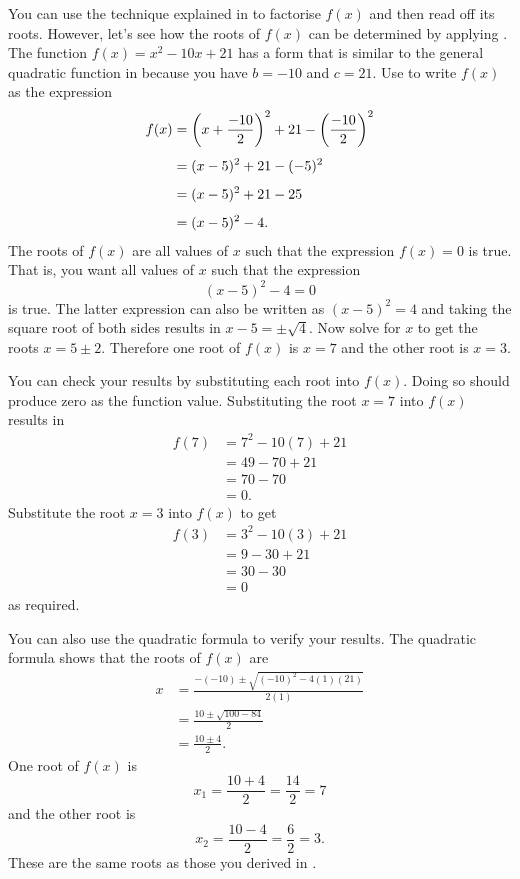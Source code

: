 \documentclass[a4paper,oneside,12pt]{article}
\begin{document}
\begin{solution}
You can use the technique explained
in  to factorise $f(x)$ and then
read off its roots.  However, let's see how the roots of $f(x)$ can be
determined by applying .  The
function $f(x) = x^2 - 10x + 21$ has a form that is similar to the
general quadratic function in 
because you have $b = -10$ and $c = 21$.  Use
 to write $f(x)$ as the expression
\begin{align*}
f(x)
&=
\parenthesis*{x + \frac{-10}{2}}^2
+
21 - \parenthesis*{\frac{-10}{2}}^2 \\[4pt]
&=
(x - 5)^2
+
21 - (-5)^2 \\[4pt]
&=
(x - 5)^2 + 21 - 25 \\[4pt]
&=
(x - 5)^2 - 4.
\end{align*}
The roots of $f(x)$ are all values of $x$ such that the expression
$f(x) = 0$ is true.  That is, you want all values of $x$ such that the
expression
\[
(x - 5)^2 - 4
=
0
\]
is true.  The latter expression can also be written as
$(x - 5)^2 = 4$ and taking the square root of both sides results in
$x - 5 = \pm\sqrt{4}$.  Now solve for $x$ to get the roots
$x = 5 \pm 2$.  Therefore one root of $f(x)$ is $x = 7$ and the other
root is $x = 3$.

You can check your results by substituting each root into $f(x)$.
Doing so should produce zero as the function value.  Substituting the
root $x = 7$ into $f(x)$ results in
\begin{align*}
f(7)
&=
7^2 - 10(7) + 21 \\[4pt]
&=
49 - 70 + 21 \\[4pt]
&=
70 - 70 \\[4pt]
&=
0.
\end{align*}
Substitute the root $x = 3$ into $f(x)$ to get
\begin{align*}
f(3)
&=
3^2 - 10(3) + 21 \\[4pt]
&=
9 - 30 + 21 \\[4pt]
&=
30 - 30 \\[4pt]
&=
0
\end{align*}
as required.

You can also use the quadratic formula to verify your results.  The
quadratic formula shows that the roots of $f(x)$ are
\begin{align*}
x
&=
\frac{
  -(-10)
  \pm
  \sqrt{(-10)^2 - 4(1)(21)}
}{
  2(1)
} \\[4pt]
&=
\frac{
  10
  \pm
  \sqrt{100 - 84}
}{
  2
} \\[4pt]
&=
\frac{
  10 \pm 4
}{
  2
}.
\end{align*}
One root of $f(x)$ is
\[
x_1
=
\frac{10 + 4}{2}
=
\frac{14}{2}
=
7
\]
and the other root is
\[
x_2
=
\frac{10 - 4}{2}
=
\frac{6}{2}
=
3.
\]
These are the same roots as those you derived
in .
\end{solution}
\end{document}
